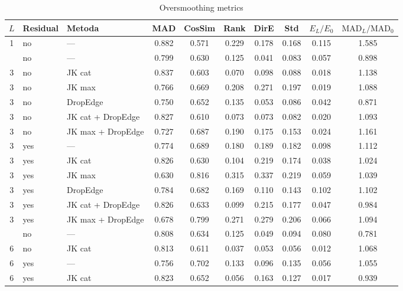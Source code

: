   \begin{table}[htbp]
    \centering
    \footnotesize
    \caption{Oversmoothing metrics}
    \label{tab:oversmoothing-stat}
    \begin{tabular}{cllccccccc}
    \toprule
    $L$ & Residual & Metoda & MAD & CosSim & Rank & DirE & Std & $E_L/E_0$ & $\mathrm{MAD}_L/\mathrm{MAD}_0$ \\
    \midrule
    1 & no & --- & 0.882 & 0.571 & 0.229 & 0.178 & 0.168 & 0.115 & 1.585 \\
    \addlinespace[4pt]
    3 & no & --- & 0.799 & 0.630 & 0.125 & 0.041 & 0.083 & 0.057 & 0.898 \\
    3 & no & JK cat & 0.837 & 0.603 & 0.070 & 0.098 & 0.088 & 0.018 & 1.138 \\
    3 & no & JK max & 0.766 & 0.669 & 0.208 & 0.271 & 0.197 & 0.019 & 1.088 \\
    3 & no & DropEdge & 0.750 & 0.652 & 0.135 & 0.053 & 0.086 & 0.042 & 0.871 \\
    3 & no & JK cat + DropEdge & 0.827 & 0.610 & 0.073 & 0.073 & 0.082 & 0.020 & 1.093 \\
    3 & no & JK max + DropEdge & 0.727 & 0.687 & 0.190 & 0.175 & 0.153 & 0.024 & 1.161 \\
    3 & yes & --- & 0.774 & 0.689 & 0.180 & 0.189 & 0.182 & 0.098 & 1.112 \\
    3 & yes & JK cat & 0.826 & 0.630 & 0.104 & 0.219 & 0.174 & 0.038 & 1.024 \\
    3 & yes & JK max & 0.630 & 0.816 & 0.315 & 0.337 & 0.219 & 0.059 & 1.039 \\
    3 & yes & DropEdge & 0.784 & 0.682 & 0.169 & 0.110 & 0.143 & 0.102 & 1.102 \\
    3 & yes & JK cat + DropEdge & 0.826 & 0.633 & 0.099 & 0.215 & 0.177 & 0.047 & 0.984 \\
    3 & yes & JK max + DropEdge & 0.678 & 0.799 & 0.271 & 0.279 & 0.206 & 0.066 & 1.094 \\
    \addlinespace[4pt]
    6 & no & --- & 0.808 & 0.634 & 0.125 & 0.049 & 0.094 & 0.080 & 0.781 \\
    6 & no & JK cat & 0.813 & 0.611 & 0.037 & 0.053 & 0.056 & 0.012 & 1.068 \\
    6 & yes & --- & 0.756 & 0.702 & 0.133 & 0.096 & 0.135 & 0.056 & 1.055 \\
    6 & yes & JK cat & 0.823 & 0.652 & 0.056 & 0.163 & 0.127 & 0.017 & 0.939 \\
    \bottomrule
    \end{tabular}
    \end{table}


